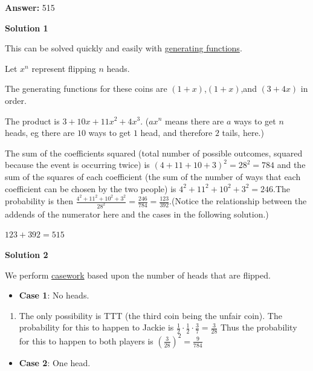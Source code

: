 \begin{enumerate}
 
 \textbf{Answer: }515



\textbf{Solution 1}

This can be solved quickly and easily with \href{https://artofproblemsolving.com/wiki/index.php?title=Generating\_functions}{generating functions}.

 Let $x^n$ represent flipping $n$ heads.

 The generating functions for these coins are $(1+x)$,$(1+x)$,and $(3+4x)$ in order.

 The product is $3+10x+11x^2+4x^3$. ($ax^n$ means there are $a$ ways to get $n$ heads, eg there are $10$ ways to get $1$ head, and therefore $2$ tails, here.)

 The sum of the coefficients squared (total number of possible outcomes, squared because the event is occurring twice) is $(4 + 11 + 10 + 3)^2 = 28^2 = 784$ and the sum of the squares of each coefficient (the sum of the number of ways that each coefficient can be chosen by the two people) is $4^2 + 11^2 + 10^2 + 3^2=246$.The probability is then $\frac{4^2 + 11^2 + 10^2 + 3^2}{28^2}  = \frac{246}{784} = \frac{123}{392}$.(Notice the relationship between the addends of the numerator here and the cases in the following solution.)

 $123 + 392 = \boxed{515}$




\textbf{Solution 2}

We perform \href{https://artofproblemsolving.com/wiki/index.php?title=Casework}{casework} based upon the number of heads that are flipped. 

 
            \begin{itemize}
        \item \textbf{Case 1}: No heads.
            \end{itemize}
            
            \begin{enumerate}[label=(\roman*)]
                \item The only possibility is TTT (the third coin being the unfair coin). The probability for this to happen to Jackie is $\frac {1}{2} \cdot \frac {1}{2} \cdot \frac {3}{7} = \frac {3}{28}$ Thus the probability for this to happen to both players is $\left(\frac {3}{28}\right)^2 = \frac {9}{784}$
            \end{enumerate}
            
            \begin{itemize}
        \item \textbf{Case 2}: One head.
            \end{itemize}
            

\end{enumerate}
